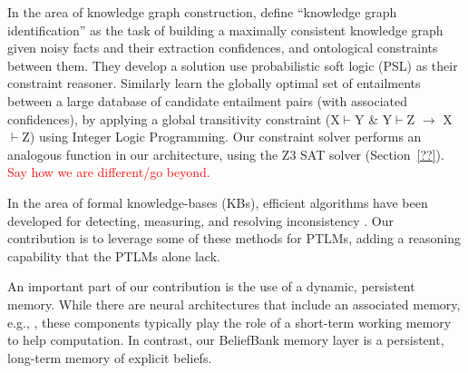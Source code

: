 \documentclass[11pt]{article}
\newcommand{\eat}[1]{}
\newcommand{\red}[1]{\textcolor{red}{#1}}
\begin{document}
In the area of knowledge graph construction,
\citet{Pujara2013KnowledgeGI} define ``knowledge graph identification''
as the task of building a maximally consistent knowledge graph given noisy facts
and their extraction confidences, and ontological constraints between them.
They develop a solution use probabilistic soft logic (PSL) \cite{Broecheler2010ProbabilisticSL}
as their constraint reasoner. 
Similarly \citet{berant2010global} learn the globally
optimal set of entailments between a large database of candidate
entailment pairs (with associated confidences), by applying
a global transitivity constraint (X$\vdash$Y \& Y$\vdash$Z $\rightarrow$ X$\vdash$Z)
using Integer Logic Programming. 
Our constraint solver performs an analogous
function in our architecture, using the Z3 SAT solver (Section~\ref{??}).
\red{Say how we are different/go beyond.}

In the area of formal knowledge-bases (KBs), efficient algorithms
have been developed for detecting, measuring, and resolving inconsistency
\cite{hansen2000probabilistic,andersen2001easy,Thimm:2009d,muino2011measuring,Thimm:2013}.
Our contribution is to leverage some of these methods for PTLMs,
adding a reasoning capability that the PTLMs alone lack.

An important part of our contribution is the use of a dynamic, persistent memory.
While there are neural architectures that include an associated memory,
e.g., \cite{Henaff2017TrackingTW,Sukhbaatar2015EndToEndMN}, these components
typically play the role of a short-term working memory to help computation.
In contrast, our BeliefBank memory layer is a persistent, long-term memory of
explicit beliefs.

\eat{
\subsection{Faithfulness}
\citet{subramanian-etal-2020-obtaining}
introduce the concept of module-wise faithfulness, a systematic evaluation of faithfulness in neural module networks for reasoning. We show that naive training does not produce faithful modules and propose several techniques to improve module-wise faithfulness. 
}
\eat{
\subsection{Inconsistencies in KGs}
(copied from old paper, need rewrite)
Consistency in KBs has been
studied in theoretical frameworks in the context of the
satisfiability problem and KB construction, and efficient
algorithms for detecting inconsistencies in KBs have been
proposed \cite{hansen2000probabilistic,andersen2001easy}.
Other work aims to quantify the degree to which KBs are
inconsistent and detects inconsistent statements
\cite{Thimm:2009d,muino2011measuring,Thimm:2013}.
}
\end{document}
